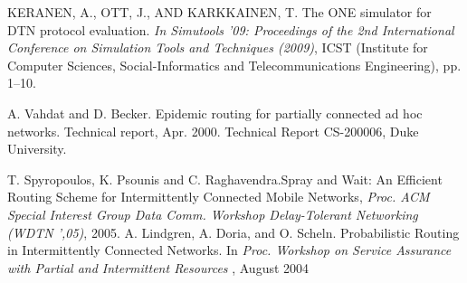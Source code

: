 \documentclass[conference]{IEEEtran}
\begin{document}
\begin{thebibliography}{1}
KERANEN, A., OTT, J., AND KARKKAINEN, T. The ONE simulator for DTN protocol evaluation. \emph{In Simutools ’09: Proceedings of the 2nd International Conference on Simulation Tools and Techniques (2009)}, ICST (Institute for Computer Sciences, Social-Informatics and Telecommunications Engineering), pp. 1–10.

A. Vahdat and D. Becker. Epidemic routing for partially connected ad hoc networks. Technical report, Apr. 2000. Technical Report CS-200006, Duke University. 

T. Spyropoulos, K. Psounis and C. Raghavendra.Spray and Wait: An Efficient Routing Scheme for Intermittently Connected Mobile Networks, \emph{Proc. ACM Special Interest Group Data Comm. Workshop Delay-Tolerant Networking (WDTN ',05)}, 2005. 
A. Lindgren, A. Doria, and O. Scheln.   Probabilistic Routing in Intermittently Connected Networks. In\emph{
Proc. Workshop on Service
Assurance with Partial and Intermittent Resources
}, August 2004
\end{thebibliography}
%
%

\end{document}
